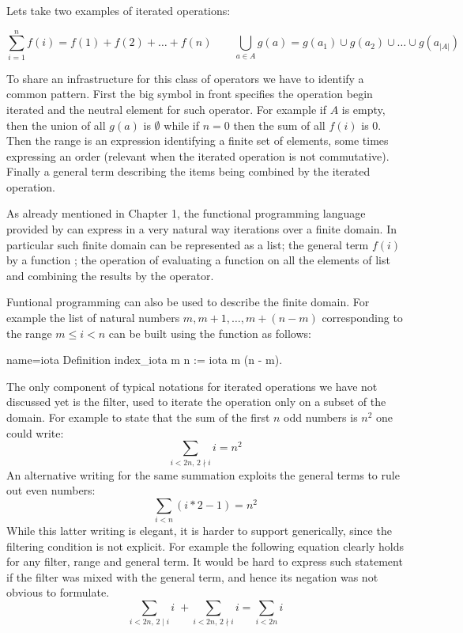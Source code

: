 Lets take two examples of iterated operations:

$$
\sum_{i=1}^n f(i) = f(1) + f(2) + \ldots + f(n)
\qquad \bigcup_{a \in A} g(a) = g(a_1) \cup g(a_2) \cup \ldots \cup g(a_{|A|})
$$

To share an infrastructure for this class of operators we have to
identify a common pattern.  First the big symbol in front specifies the
operation begin iterated and the neutral element for such operator.
For example if $A$ is empty, then the union of all $g(a)$ is $\emptyset$
while if $n=0$ then the sum of all $f(i)$ is $0$.
Then the range is an expression identifying a finite set of elements,
some times expressing an order (relevant when the iterated operation is not
commutative).  Finally a general term describing the
items being combined by the iterated operation.

As already mentioned in Chapter 1, %
the functional programming language
provided by \Coq{} can express in a very natural way iterations over
a finite domain.  In particular such finite domain can be represented
as a list; the general term $f(i)$ by a function ; the operation of evaluating a function on all the
elements of list and combining the results by the  operator.

Funtional programming can also be used to describe the finite domain.
For example the list of natural numbers $m, m+1, \ldots, m + (n-m)$ 
corresponding to the range $m \leq i < n$ can be built using the 
function as follows:
\begin{coq}{name=iota}{}
Definition index_iota m n := iota m (n - m).
\end{coq}

The only component of typical notations for iterated operations we have not
discussed yet is the filter, used to iterate the operation only on a
subset of the domain.
For example to state that the sum of the first $n$ odd numbers is $n^2$ 
one could write:
$$
\sum_{i < 2n,\, 2 \nmid i} i = n^2
$$
An alternative writing for the same summation exploits the general
terms to rule out even numbers:
$$
\sum_{i < n} (i * 2 - 1) = n^2
$$
While this latter writing is elegant, it is harder to support
generically, since the filtering condition is not explicit.
For example the following equation clearly holds for any filter,
range and general term.  It would be hard to express such statement
if the filter was mixed with the general term, and hence its
negation was not obvious to formulate.
$$
\sum_{i < 2n,\,  2 \mid i} i \;+ \sum_{i < 2n,\,  2 \nmid i}  i = \sum_{i < 2n} i
$$

